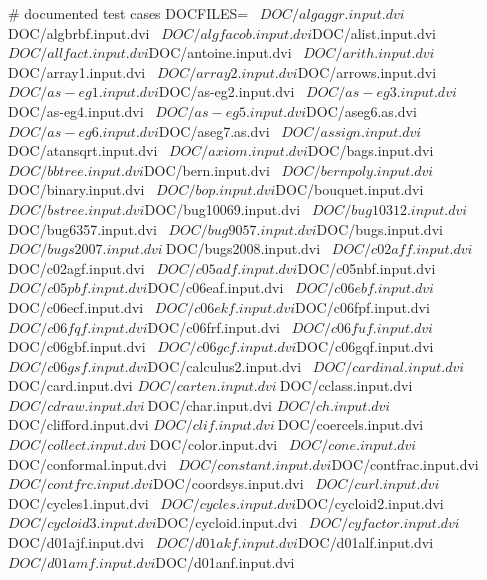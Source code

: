 \documentclass{article}
\begin{document}
# documented test cases
DOCFILES= \
  ${DOC}/algaggr.input.dvi     ${DOC}/algbrbf.input.dvi    \
  ${DOC}/algfacob.input.dvi    ${DOC}/alist.input.dvi      \
  ${DOC}/allfact.input.dvi     ${DOC}/antoine.input.dvi    \
  ${DOC}/arith.input.dvi       ${DOC}/array1.input.dvi     \
  ${DOC}/array2.input.dvi      ${DOC}/arrows.input.dvi     \
  ${DOC}/as-eg1.input.dvi      ${DOC}/as-eg2.input.dvi     \
  ${DOC}/as-eg3.input.dvi      ${DOC}/as-eg4.input.dvi     \
  ${DOC}/as-eg5.input.dvi      ${DOC}/aseg6.as.dvi         \
  ${DOC}/as-eg6.input.dvi      ${DOC}/aseg7.as.dvi         \
  ${DOC}/assign.input.dvi      ${DOC}/atansqrt.input.dvi   \
  ${DOC}/axiom.input.dvi       ${DOC}/bags.input.dvi       \
  ${DOC}/bbtree.input.dvi      ${DOC}/bern.input.dvi       \
  ${DOC}/bernpoly.input.dvi    ${DOC}/binary.input.dvi     \
  ${DOC}/bop.input.dvi         ${DOC}/bouquet.input.dvi    \
  ${DOC}/bstree.input.dvi      ${DOC}/bug10069.input.dvi   \
  ${DOC}/bug10312.input.dvi    ${DOC}/bug6357.input.dvi    \
  ${DOC}/bug9057.input.dvi     ${DOC}/bugs.input.dvi       \
  ${DOC}/bugs2007.input.dvi \
  ${DOC}/bugs2008.input.dvi \
  ${DOC}/c02aff.input.dvi      ${DOC}/c02agf.input.dvi     \
  ${DOC}/c05adf.input.dvi      ${DOC}/c05nbf.input.dvi     \
  ${DOC}/c05pbf.input.dvi      ${DOC}/c06eaf.input.dvi     \
  ${DOC}/c06ebf.input.dvi      ${DOC}/c06ecf.input.dvi     \
  ${DOC}/c06ekf.input.dvi      ${DOC}/c06fpf.input.dvi     \
  ${DOC}/c06fqf.input.dvi      ${DOC}/c06frf.input.dvi     \
  ${DOC}/c06fuf.input.dvi      ${DOC}/c06gbf.input.dvi     \
  ${DOC}/c06gcf.input.dvi      ${DOC}/c06gqf.input.dvi     \
  ${DOC}/c06gsf.input.dvi      ${DOC}/calculus2.input.dvi  \
  ${DOC}/cardinal.input.dvi   \
  ${DOC}/card.input.dvi        ${DOC}/carten.input.dvi     \
  ${DOC}/cclass.input.dvi      ${DOC}/cdraw.input.dvi      \
  ${DOC}/char.input.dvi        ${DOC}/ch.input.dvi         \
  ${DOC}/clifford.input.dvi    ${DOC}/clif.input.dvi       \
  ${DOC}/coercels.input.dvi    ${DOC}/collect.input.dvi    \
  ${DOC}/color.input.dvi       \
  ${DOC}/cone.input.dvi        ${DOC}/conformal.input.dvi  \
  ${DOC}/constant.input.dvi    ${DOC}/contfrac.input.dvi   \
  ${DOC}/contfrc.input.dvi     ${DOC}/coordsys.input.dvi   \
  ${DOC}/curl.input.dvi        ${DOC}/cycles1.input.dvi    \
  ${DOC}/cycles.input.dvi      ${DOC}/cycloid2.input.dvi   \
  ${DOC}/cycloid3.input.dvi    ${DOC}/cycloid.input.dvi    \
  ${DOC}/cyfactor.input.dvi    ${DOC}/d01ajf.input.dvi     \
  ${DOC}/d01akf.input.dvi      ${DOC}/d01alf.input.dvi     \
  ${DOC}/d01amf.input.dvi      ${DOC}/d01anf.input.dvi     \
\end{document}
